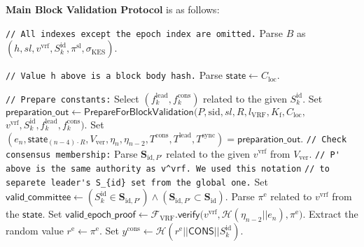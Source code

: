 \bigbreak
\bigbreak
\noindent
{}
\textbf{Main Block Validation Protocol}\label{apndx:block-validation-protocol} is as follows:
\begin{protocol}
    \caption{$\textsf{IsValidBlock}(P, \text{sid}, R, l_{\text{VRF}}, K_{\text{f}}, \mathcal{C}_{\text{loc}}, B,
    \mathbf{S}_{\text{id}} = \{S_k^{\text{id}}\}_{k=1}^K,
    \mathbf{f}_{\text{lead}} =  \{f^{\text{lead}}_k\}_{k=1}^K,
    \mathbf{f}_{\text{cons}} = \{f^{\text{cons}}_k\}_{k=1}^K)$}
    \begin{algorithmic}[1]
        \noindent
        \lstinline|// All indexes except the epoch index are omitted.|
        \State Parse $B$ as $(h, sl, v^{\text{vrf}}, S_k^{\text{id}}, \pi^{\text{sl}}, \sigma_{\text{KES}})$.

        \noindent
        \lstinline|// Value h above is a block body hash.|
        \State Parse $\textsf{state} \leftarrow C_{\text{loc}}$.

        \noindent
        \lstinline|// Prepare constants:|
        \State Select $(f^{\text{lead}}_k, f^{\text{cons}}_k)$ related to the given $S_k^{\text{id}}$.
        \State Set $\textsf{preparation\_out} \leftarrow \textsf{PrepareForBlockValidation}(P, \text{sid}, sl, R, l_{\text{VRF}}, K_{\text{f}}, C_{\text{loc}},$
        $v^{\text{vrf}}, S_k^{\text{id}}, f^{\text{lead}}_k, f^{\text{cons}}_k)$.
        \State Set $(e_n, \textsf{state}_{(n - 4)\cdot R}, V_{\text{ver}}, \eta_{n}, \eta_{n - 2}, T^{\text{cons}}, T^{\text{lead}}, T^{\text{sync}}) = \textsf{preparation\_out}$.
        \noindent
        \lstinline|// Check consensus membership:|
        \State Parse $\mathbf{S}_{\text{id}, P'}$ related to the given $v^{\text{vrf}}$ from $V_{\text{ver}}$.
        \noindent
        \lstinline|// P' above is the same authority as v^vrf. We used this notation|
        \noindent
        \lstinline|// to separete leader's S_{id} set from the global one.|
        \State Set $\textsf{valid\_committee} \leftarrow (S_k^{\text{id}} \in \mathbf{S}_{\text{id}, P'}) \wedge (\mathbf{S}_{\text{id}, P'} \subset \mathbf{S}_{\text{id}})$.
        \State Parse ${\pi^{\text{e}}}$ related to $v^{\text{vrf}}$ from the $\textsf{state}$.
        \State Set $\textsf{valid\_epoch\_proof} \leftarrow \mathcal{F}_{\text{VRF}}\textsf{.verify(}
        v^{\text{vrf}}, \mathcal{H}(\eta_{n - 2} || e_n),\pi^{\text{e}} \textsf{)}$.
        \State Extract the random value ${r^{\text{e}} \leftarrow \pi^{\text{e}}}$.
        \State Set ${y^{\text{cons}} \leftarrow {\mathcal{H}(r^{\text{e}} || \textsf{CONS} || S_k^{\text{id}})}}$.


\end{algorithmic}
\end{protocol}
